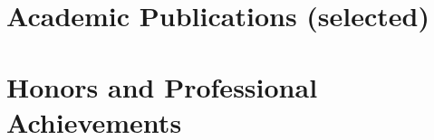 \documentclass[letterpaper, 11pt]{article}
\renewenvironment{itemize}{
  \begin{list}{}{
    \setlength{\leftmargin}{0.45cm}
  }
}{
  \end{list}
}
\begin{document}
\section*{Academic Publications {\small (selected)}}

\nocite{yon2019exponential,VegaYon2019c,VegaYon2019a,vegayon2020aphylo} %

\printbibliography[title=\vskip-20pt,omitnumbers=true]



%

%

\section*{Honors and Professional Achievements}
\end{document}

